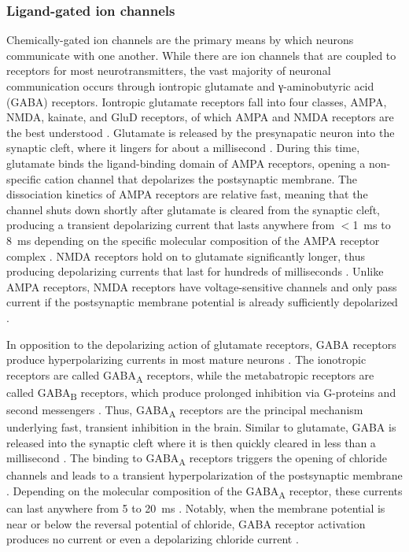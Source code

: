 \subsubsection{Ligand-gated ion channels} \label{sec:I_syn}
Chemically-gated ion channels are the primary means by which neurons communicate with one another. While there are ion channels that are coupled to receptors for most neurotransmitters, the vast majority of neuronal communication occurs through iontropic glutamate and γ-aminobutyric acid (GABA) receptors. Iontropic glutamate receptors fall into four classes, AMPA, NMDA, kainate, and GluD receptors, of which AMPA and NMDA receptors are the best understood \cite{Hansen2021}. Glutamate is released by the presynapatic neuron into the synaptic cleft, where it lingers for about a millisecond \cite{Clements1992}. During this time, glutamate binds the ligand-binding domain of AMPA receptors, opening a non-specific cation channel that depolarizes the postsynaptic membrane. The dissociation kinetics of AMPA receptors are relative fast, meaning that the channel shuts down shortly after glutamate is cleared from the synaptic cleft, producing a transient depolarizing current that lasts anywhere from $<$\qty{1}{\milli\second} to \qty{8}{\milli\second} depending on the specific molecular composition of the AMPA receptor complex \cite{Geiger1997,Howe2015,Greger2017}. NMDA receptors hold on to glutamate significantly longer, thus producing depolarizing currents that last for hundreds of milliseconds \cite{Lester1990}. Unlike AMPA receptors, NMDA receptors have voltage-sensitive channels and only pass current if the postsynaptic membrane potential is already sufficiently depolarized \cite{Mayer1984}. 

In opposition to the depolarizing action of glutamate receptors, GABA receptors produce hyperpolarizing currents in most mature neurons \cite{Farrant2005}. The ionotropic receptors are called GABA\textsubscript{A} receptors, while the metabatropic receptors are called GABA\textsubscript{B} receptors, which produce prolonged inhibition via G-proteins and second messengers \cite{Bettler2004}. Thus, GABA\textsubscript{A} receptors are the principal mechanism underlying fast, transient inhibition in the brain. Similar to glutamate, GABA is released into the synaptic cleft where it is then quickly cleared in less than a millisecond \cite{Mozrzymas2003}. The binding to GABA\textsubscript{A} receptors triggers the opening of chloride channels and leads to a transient hyperpolarization of the postsynaptic membrane \cite{Farrant2005}. Depending on the molecular composition of the GABA\textsubscript{A} receptor, these currents can last anywhere from 5 to \qty{20}{\milli\second} \cite{Farrant2005,Bacci2003}. Notably, when the membrane potential is near or below the reversal potential of chloride, GABA receptor activation produces no current or even a depolarizing chloride current \cite{Alger1979,Andersen1980}.

